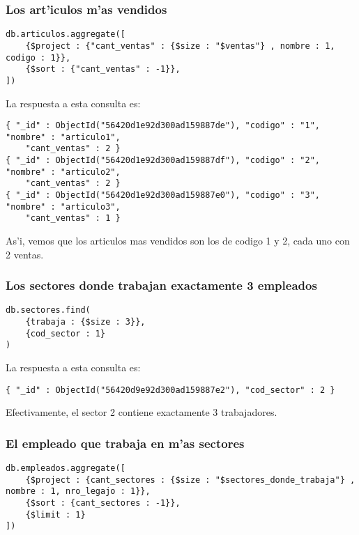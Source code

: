 \subsubsection{Los art'iculos m'as vendidos}

\begin{verbatim}
db.articulos.aggregate([
    {$project : {"cant_ventas" : {$size : "$ventas"} , nombre : 1, codigo : 1}},
    {$sort : {"cant_ventas" : -1}},
])
\end{verbatim}

La respuesta a esta consulta es:

\begin{verbatim}
{ "_id" : ObjectId("56420d1e92d300ad159887de"), "codigo" : "1", "nombre" : "articulo1",
    "cant_ventas" : 2 }
{ "_id" : ObjectId("56420d1e92d300ad159887df"), "codigo" : "2", "nombre" : "articulo2",
    "cant_ventas" : 2 }
{ "_id" : ObjectId("56420d1e92d300ad159887e0"), "codigo" : "3", "nombre" : "articulo3",
    "cant_ventas" : 1 }
\end{verbatim}

As'i, vemos que los articulos mas vendidos son los de codigo 1 y 2, cada uno con 2 ventas.


\subsubsection{Los sectores donde trabajan exactamente 3 empleados}

\begin{verbatim}
db.sectores.find(
    {trabaja : {$size : 3}},
    {cod_sector : 1}
)
\end{verbatim}

La respuesta a esta consulta es:

\begin{verbatim}
{ "_id" : ObjectId("56420d9e92d300ad159887e2"), "cod_sector" : 2 }
\end{verbatim}

Efectivamente, el sector 2 contiene exactamente 3 trabajadores.


\subsubsection{El empleado que trabaja en m'as sectores}

\begin{verbatim}
db.empleados.aggregate([
    {$project : {cant_sectores : {$size : "$sectores_donde_trabaja"} , nombre : 1, nro_legajo : 1}},
    {$sort : {cant_sectores : -1}},
    {$limit : 1}
])
\end{verbatim}

